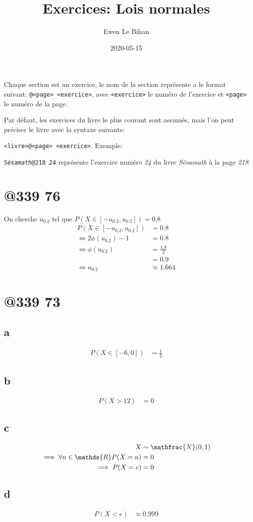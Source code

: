 \documentclass{article}
\title{Exercices: Lois normales}
\author{Ewen Le Bihan}
\date{2020-05-15}
\newcommand{\R}{\mathds{R}}
\newcommand{\equa}[1]{\begin{equation*}\begin{split}#1\end{split}\end{equation*}}
\begin{document}
\maketitle

\abstract{}
Chaque section est un exercice, le nom de la section représente a le format suivant:
\texttt{@<page> <exercice>}, avec \texttt{<exercice>} le numéro de l'exercice et \texttt{<page>} le numéro de la page.

Par défaut, les exercices du livre le plus courant sont assumés, mais l'on peut préciser le livre avec la syntaxe suivante:

\texttt{<livre>@<page> <exercice>}.
Exemple:

\texttt{Sésamath@218 24} représente l'exercice numéro \emph{24} du livre \emph{Sésamath} à la page \emph{218}

\section*{@339 76}
On cherche $u_{0.2}$ tel que $P(X \in [-u_{0.2}, u_{0.2}]) = 0.8$
\equa{
	P(X \in [-u_{0.2}, u_{0.2}]) &= 0.8 \\
	\iff 2\phi(u_{0.2})-1 &= 0.8 \\
	\iff \phi(u_{0.2}) &= \frac{1.8}{2} \\
			   &= 0.9 \\
	\iff u_{0.2} &\approx 1.664
}



\section*{@339 73}
\subsection*{a}
\equa{
	P(X \in [-6, 0]) &= \frac{1}{2}
}
\subsection*{b}
\equa{
	P(X > 12) &= 0
}
\subsection*{c}
\equa{
	X &\sim \mathfrac{N}(0,1) \\
	\implies \forall n \in \R P(X=n) &= 0 \\
	\implies P(X=e) &= 0 
}
\subsection*{d}
\equa{ P(X < e) &\approx 0.999 }
\end{document}
